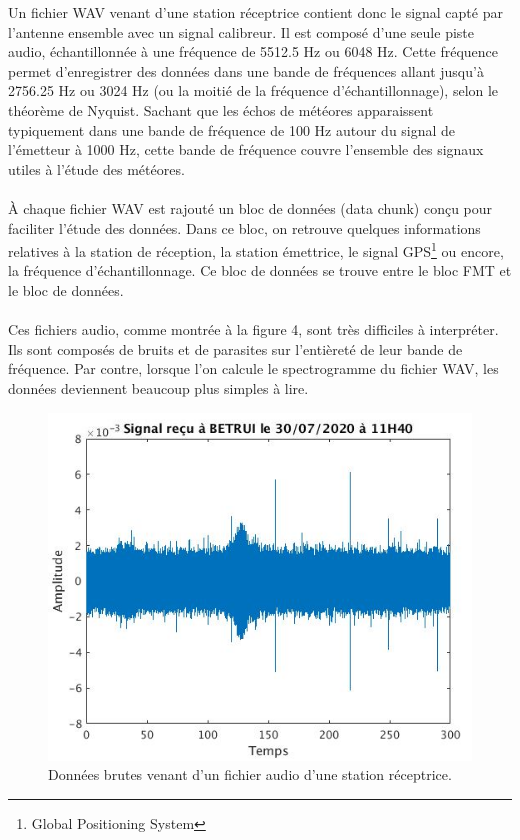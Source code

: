 \documentclass[11pt]{article}
\begin{document}
Un fichier WAV venant d'une station réceptrice contient donc le signal capté par l'antenne ensemble avec un signal calibreur.
Il est composé d'une seule piste audio, échantillonnée à une fréquence de 5512.5 Hz ou 6048 Hz.
Cette fréquence permet d'enregistrer des données dans une bande de fréquences allant jusqu'à 2756.25 Hz ou 3024 Hz (ou la moitié de la fréquence d'échantillonnage), selon le théorème de Nyquist.
Sachant que les échos de météores apparaissent typiquement dans une bande de fréquence de 100 Hz autour du signal de l'émetteur à 1000 Hz, cette bande de fréquence couvre l'ensemble des signaux utiles à l'étude des météores.\\
\\
À chaque fichier WAV est rajouté un bloc de données (data chunk) conçu pour faciliter l'étude des données.
Dans ce bloc, on retrouve quelques informations relatives à la station de réception, la station émettrice, le signal GPS\footnote{Global Positioning System} ou encore, la fréquence d'échantillonnage.
Ce bloc de données se trouve entre le bloc FMT et le bloc de données.\\
\\
Ces fichiers audio, comme montrée à la figure 4, sont très difficiles à interpréter.
Ils sont composés de bruits et de parasites sur l'entièreté de leur bande de fréquence.
Par contre, lorsque l'on calcule le spectrogramme du fichier WAV, les données deviennent beaucoup plus simples à lire.
\begin{figure}[t]
    \begin{center}
        \includegraphics[scale=0.5]{wav_brut.png}
        \caption{Données brutes venant d'un fichier audio d'une station réceptrice.}
    \end{center}
\end{figure}
\end{document}
